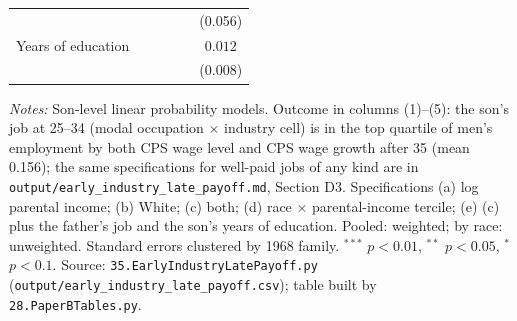 \begin{table}[!htbp]
{{\begin{tabular}{lccccc}
 &  &  &  &  & (0.056) \\
Years of education &  &  &  &  & $0.012$ \\
 &  &  &  &  & (0.008) \\
\bottomrule
\end{tabular}}}
\par\smallskip
\begin{minipage}{\textwidth}\footnotesize \textit{Notes:} Son-level linear probability models. Outcome in columns (1)--(5): the son's job at 25--34 (modal occupation $\times$ industry cell) is in the top quartile of men's employment by both CPS wage level and CPS wage growth after 35 (mean 0.156); the same specifications for well-paid jobs of any kind are in \texttt{output/early\_industry\_late\_payoff.md}, Section D3. Specifications (a) log parental income; (b) White; (c) both; (d) race $\times$ parental-income tercile; (e) (c) plus the father's job and the son's years of education. Pooled: weighted; by race: unweighted. Standard errors clustered by 1968 family. $^{***}$ $p<0.01$, $^{**}$ $p<0.05$, $^{*}$ $p<0.1$. Source: \texttt{35.EarlyIndustryLatePayoff.py} (\texttt{output/early\_industry\_late\_payoff.csv}); table built by \texttt{28.PaperBTables.py}.\end{minipage}
\end{table}
